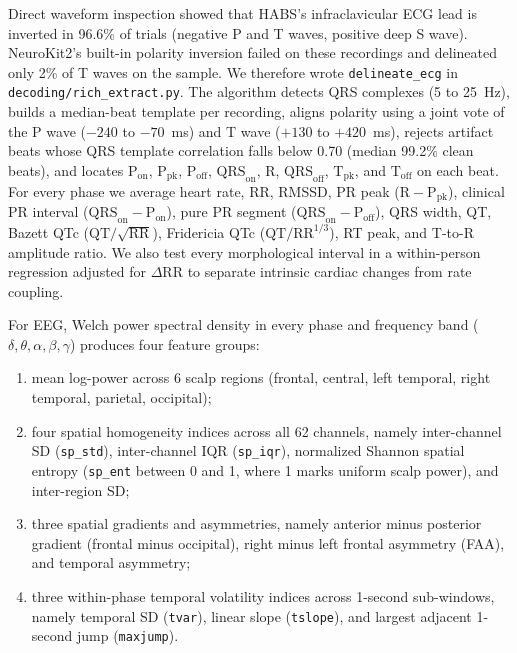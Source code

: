 \documentclass[10pt]{article}
\begin{document}
Direct waveform inspection showed that HABS's infraclavicular ECG lead is inverted in 96.6\% of trials (negative P and T waves, positive deep S wave). NeuroKit2's built-in polarity inversion failed on these recordings and delineated only 2\% of T waves on the sample. We therefore wrote \texttt{delineate\_ecg} in \texttt{decoding/\allowbreak rich\_extract.py}. The algorithm detects QRS complexes (5 to 25~Hz), builds a median-beat template per recording, aligns polarity using a joint vote of the P wave ($-240$ to $-70$~ms) and T wave ($+130$ to $+420$~ms), rejects artifact beats whose QRS template correlation falls below 0.70 (median 99.2\% clean beats), and locates $\mathrm{P}_{\text{on}}$, $\mathrm{P}_{\text{pk}}$, $\mathrm{P}_{\text{off}}$, $\mathrm{QRS}_{\text{on}}$, R, $\mathrm{QRS}_{\text{off}}$, $\mathrm{T}_{\text{pk}}$, and $\mathrm{T}_{\text{off}}$ on each beat. For every phase we average heart rate, RR, RMSSD, PR peak ($\mathrm{R} - \mathrm{P}_{\text{pk}}$), clinical PR interval ($\mathrm{QRS}_{\text{on}} - \mathrm{P}_{\text{on}}$), pure PR segment ($\mathrm{QRS}_{\text{on}} - \mathrm{P}_{\text{off}}$), QRS width, QT, Bazett QTc ($\mathrm{QT}/\sqrt{\mathrm{RR}}$), Fridericia QTc ($\mathrm{QT}/\mathrm{RR}^{1/3}$), RT peak, and T-to-R amplitude ratio. We also test every morphological interval in a within-person regression adjusted for $\Delta\mathrm{RR}$ to separate intrinsic cardiac changes from rate coupling.

For EEG, Welch power spectral density in every phase and frequency band ($\delta, \theta, \alpha, \beta, \gamma$) produces four feature groups:
\begin{enumerate}
\item mean log-power across 6 scalp regions (frontal, central, left temporal, right temporal, parietal, occipital);
\item four spatial homogeneity indices across all 62 channels, namely inter-channel SD (\texttt{sp\_std}), inter-channel IQR (\texttt{sp\_iqr}), normalized Shannon spatial entropy (\texttt{sp\_ent} between 0 and 1, where 1 marks uniform scalp power), and inter-region SD;
\item three spatial gradients and asymmetries, namely anterior minus posterior gradient (frontal minus occipital), right minus left frontal asymmetry (FAA), and temporal asymmetry;
\item three within-phase temporal volatility indices across 1-second sub-windows, namely temporal SD (\texttt{tvar}), linear slope (\texttt{tslope}), and largest adjacent 1-second jump (\texttt{maxjump}).
\end{enumerate}
\end{document}
